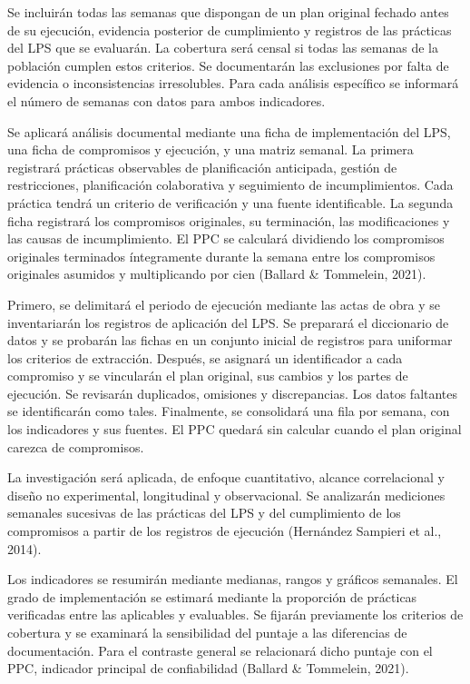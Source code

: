 \documentclass[12pt,a4paper]{article}
\begin{document}
Se incluirán todas las semanas que dispongan de un plan original fechado antes de su ejecución, evidencia posterior de cumplimiento y registros de las prácticas del LPS que se evaluarán. La cobertura será censal si todas las semanas de la población cumplen estos criterios. Se documentarán las exclusiones por falta de evidencia o inconsistencias irresolubles. Para cada análisis específico se informará el número de semanas con datos para ambos indicadores.

Se aplicará análisis documental mediante una ficha de implementación del LPS, una ficha de compromisos y ejecución, y una matriz semanal. La primera registrará prácticas observables de planificación anticipada, gestión de restricciones, planificación colaborativa y seguimiento de incumplimientos. Cada práctica tendrá un criterio de verificación y una fuente identificable. La segunda ficha registrará los compromisos originales, su terminación, las modificaciones y las causas de incumplimiento. El PPC se calculará dividiendo los compromisos originales terminados íntegramente durante la semana entre los compromisos originales asumidos y multiplicando por cien (Ballard \& Tommelein, 2021).

Primero, se delimitará el periodo de ejecución mediante las actas de obra y se inventariarán los registros de aplicación del LPS. Se preparará el diccionario de datos y se probarán las fichas en un conjunto inicial de registros para uniformar los criterios de extracción. Después, se asignará un identificador a cada compromiso y se vincularán el plan original, sus cambios y los partes de ejecución. Se revisarán duplicados, omisiones y discrepancias. Los datos faltantes se identificarán como tales. Finalmente, se consolidará una fila por semana, con los indicadores y sus fuentes. El PPC quedará sin calcular cuando el plan original carezca de compromisos.

La investigación será aplicada, de enfoque cuantitativo, alcance correlacional y diseño no experimental, longitudinal y observacional. Se analizarán mediciones semanales sucesivas de las prácticas del LPS y del cumplimiento de los compromisos a partir de los registros de ejecución (Hernández Sampieri et al., 2014).

Los indicadores se resumirán mediante medianas, rangos y gráficos semanales. El grado de implementación se estimará mediante la proporción de prácticas verificadas entre las aplicables y evaluables. Se fijarán previamente los criterios de cobertura y se examinará la sensibilidad del puntaje a las diferencias de documentación. Para el contraste general se relacionará dicho puntaje con el PPC, indicador principal de confiabilidad (Ballard \& Tommelein, 2021).
\end{document}
